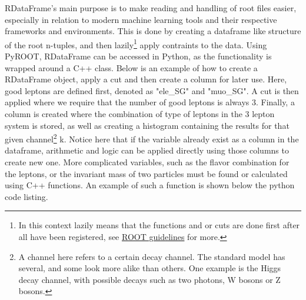 RDataFrame's main purpose is to make reading and handling of root files easier, especially in relation to modern machine learning tools and their 
respective frameworks and environments. This is done by creating a dataframe like structure of the root n-tuples, and then 
lazily\footnote{In this context lazily means that the functions and or cuts are done first after all have been registered, see \href{https://root.cern/doc/master/classROOT_1_1RDataFrame.html}{ROOT guidelines} for more.} 
apply contraints to the data. Using PyROOT, RDataFrame can be accessed in Python, as the functionality is wrapped around a C++ class. Below is an example of how
to create a RDataFrame object, apply a cut and then create a column for later use. Here, good leptons are defined first, denoted as "ele\_SG" and "muo\_SG". 
A cut is then applied where we require that the number of good leptons is always 3. Finally, a column is created where the combination of type of leptons 
in the 3 lepton system is stored, as well as creating a histogram containing the results for that given channel\footnote{A channel here refers to a certain decay channel. The standard model has several, and some look more alike than others. One example is the Higgs decay channel, with possible decays such as two photons, W bosons or Z bosons. } 
k. Notice here that if the variable already exist as a column in the dataframe, arithmetic and logic can be applied directly using those 
columns to create new one. More complicated variables, such as the flavor combination for the leptons, or the invariant mass of two particles must be 
found or calculated using C++ functions. An example of such a function is shown below the python code listing. 

